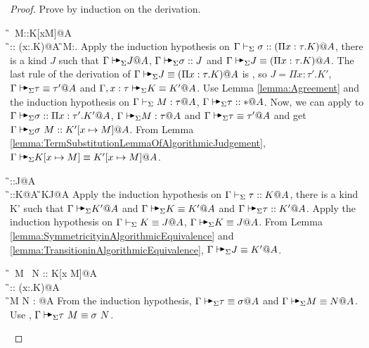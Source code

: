 \begin{proof}
    Prove by induction on the derivation.
    \begin{rneqncase}{\KApp}{
            \G\V \sigma\ M::K[x\mapsto M]@A \\
            \G\V \sigma:: (\Pi x:\tau.K)@A  \G\V M:\tau@A.
        }
        Apply the induction hypothesis on \( \Gamma\vdash_\Sigma \sigma:: (\Pi x:\tau.K)@A \),
        there is a kind \( J \) such that \( \G\AVS J @A \), \( \G\AVS \sigma
        :: J \) and \( \G\AVS J \E (\Pi x:\tau.K)@A \).  The last rule of the
        derivation of \( \G\AVS J \E (\Pi x:\tau.K)@A \) is \QTAAbs, so \( J =
        \Pi x:\tau'.K' \), \( \G \AVS \tau \E \tau' @ A \) and \( \G, x:\tau
        \AVS K \E K' @ A \).  Use Lemma \ref{lemma:Agreement} and the induction
        hypothesis on \( \Gamma \vdash_\Sigma M : \tau @ A \), \( \G \AVS \tau :: * @ A \).
        Now, we can apply \KAApp to \( \G \AVS \sigma :: \Pi x:\tau'.K' @ A \),
        \( \G \AVS M: \tau @ A \) and \( \G \AVS \tau \E \tau' @ A\) and get \(
        \G \AVS \sigma\ M :: K'[x \mapsto M] @ A \).  From Lemma
        \ref{lemma:TermSubstitutionLemmaOfAlgorithmicJudgement}, \( \G \AVS K[x
        \mapsto M] \E K'[x \mapsto M] @ A \).
    \end{rneqncase}
    \begin{rneqncase}{\KConv}{
            \G\V \tau::J@A \\
            \G\V \tau::K@A 
            \G\V K\equiv J@A
        }
        Apply the induction hypothesis on \( \Gamma\vdash_\Sigma \tau::K@A \),
        there is a kind K' such that \( \G \AVS K' @ A \) and 
        \( \G \AVS K\E K' @ A \) and \( \G\AVS \tau :: K' @ A \).
        Apply the induction hypothesis on \( \Gamma\vdash_\Sigma K\equiv J@A \),
        \( \G\AVS K\equiv J@A \).
        From Lemma \ref{lemma:SymmetricityinAlgorithmicEquivalence} and
        \ref {lemma:TransitioninAlgorithmicEquivalence}, \( \G \AVS J \E K' @ A \).
    \end{rneqncase}
    \begin{rneqncase}{\QTApp}{
            \G\V \tau\ M \E \sigma\ N :: K[x \mapsto M]@A \\
            \G\V \tau \E \sigma :: (\Pi x:\rho.K)@A  \\
            \G\V M \E N : \rho @A
        }
        From the induction hypothesis, \( \G\AVS \tau \E \sigma@A \) and \(
        \G\AVS M \E N @A \). Use \TAApp, \( \G\AVS \tau\ M \E \sigma\ N \).

\end{rneqncase}
\end{proof}

